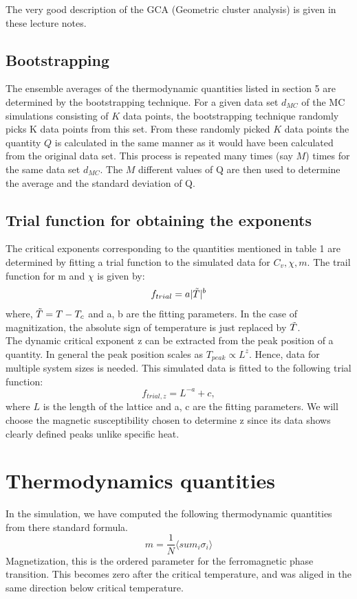 \documentclass[a4paper,8pt]{article}
\begin{document}
The very good description of the GCA (Geometric cluster analysis) is given in these lecture notes.\supercite{wow}
\subsection{Bootstrapping}
The ensemble averages of the thermodynamic quantities listed in section 5 are determined by the bootstrapping technique. For a given data set $d_{MC}$ of the MC simulations consisting of $K$ data points, the bootstrapping technique randomly picks K data points from this set. From these randomly picked $K$ data points the quantity $Q$ is calculated in the same manner as it would have been calculated from the original data set. This process is repeated many times (say $M$) times for the same data set $d_{MC}$. The $M$ different values of Q are then used to determine the average and the standard deviation of Q.

\subsection{Trial function for obtaining the exponents}
The critical exponents corresponding to the quantities mentioned in table 1 are determined by fitting a trial function to the simulated data for $C_v, \chi, m$. The trail function for m and $\chi$ is given by:
\begin{equation}
    f_{trial} = a|\Tilde{T}|^b  \label{eq:trial_critical}
\end{equation}
where, $\Tilde{T} = T - T_c$ and a, b are the fitting parameters. In the case of magnitization, the absolute sign of temperature is just replaced by $\Tilde{T}$. \\

The dynamic critical exponent z can be extracted from the peak position of a quantity. In general the peak position scales as $T_{peak} \propto L^z$. Hence, data for multiple system sizes is needed. This simulated data is fitted to the following trial function:
\begin{equation}
    f_{trial, z} = L^{-a} + c,  \label{eq:trial_dynamical}
\end{equation}
where $L$ is the length of the lattice and a, c are the fitting parameters. We will choose the magnetic susceptibility chosen to determine z since its data shows clearly defined peaks unlike specific heat.


\section{Thermodynamics quantities}
In the simulation, we have computed the following thermodynamic quantities from there standard formula. 
\begin{equation}
     m = \frac{1}{N} \langle sum_{i} \sigma_{i} \rangle
\end{equation}
Magnetization, this is the ordered parameter for the ferromagnetic phase transition. This becomes zero after the critical temperature, and was aliged in the same direction below critical temperature. \\
\end{document}
